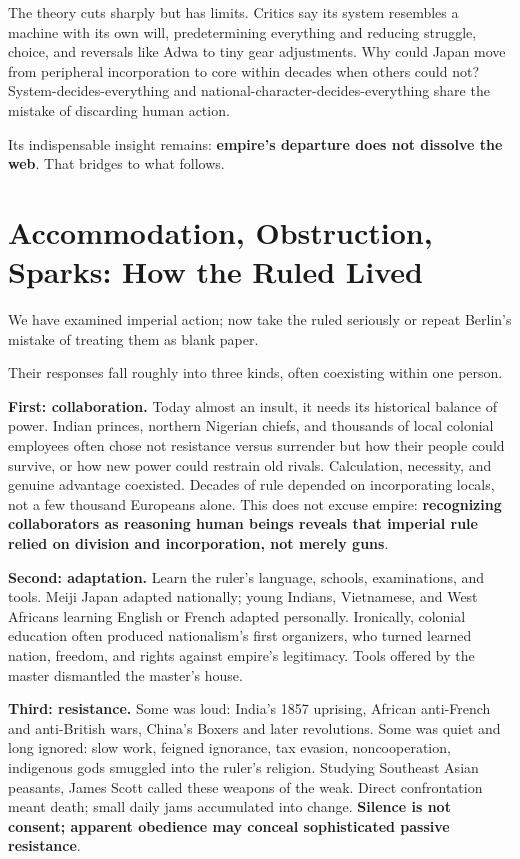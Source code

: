 The theory cuts sharply but has limits. Critics say its system resembles a machine with its own will, predetermining everything and reducing struggle, choice, and reversals like Adwa to tiny gear adjustments. Why could Japan move from peripheral incorporation to core within decades when others could not? System-decides-everything and national-character-decides-everything share the mistake of discarding human action.

Its indispensable insight remains: \textbf{empire's departure does not dissolve the web}. That bridges to what follows.

\section[How the Ruled Lived]{Accommodation, Obstruction, Sparks: How the Ruled Lived}
We have examined imperial action; now take the ruled seriously or repeat Berlin's mistake of treating them as blank paper.

Their responses fall roughly into three kinds, often coexisting within one person.

\textbf{First: collaboration.} Today almost an insult, it needs its historical balance of power. Indian princes, northern Nigerian chiefs, and thousands of local colonial employees often chose not resistance versus surrender but how their people could survive, or how new power could restrain old rivals. Calculation, necessity, and genuine advantage coexisted. Decades of rule depended on incorporating locals, not a few thousand Europeans alone. This does not excuse empire: \textbf{recognizing collaborators as reasoning human beings reveals that imperial rule relied on division and incorporation, not merely guns}.

\textbf{Second: adaptation.} Learn the ruler's language, schools, examinations, and tools. Meiji Japan adapted nationally; young Indians, Vietnamese, and West Africans learning English or French adapted personally. Ironically, colonial education often produced nationalism's first organizers, who turned learned nation, freedom, and rights against empire's legitimacy. Tools offered by the master dismantled the master's house.

\textbf{Third: resistance.} Some was loud: India's 1857 uprising, African anti-French and anti-British wars, China's Boxers and later revolutions. Some was quiet and long ignored: slow work, feigned ignorance, tax evasion, noncooperation, indigenous gods smuggled into the ruler's religion. Studying Southeast Asian peasants, James Scott called these weapons of the weak. Direct confrontation meant death; small daily jams accumulated into change. \textbf{Silence is not consent; apparent obedience may conceal sophisticated passive resistance}.

